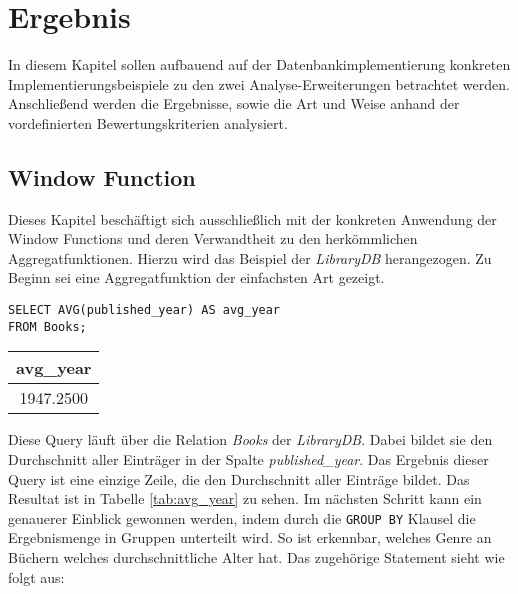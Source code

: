 \chapter{Ergebnis}
In diesem Kapitel sollen aufbauend auf der Datenbankimplementierung konkreten Implementierungsbeispiele
zu den zwei Analyse-Erweiterungen betrachtet werden. Anschließend werden die
Ergebnisse, sowie die Art und Weise anhand der vordefinierten Bewertungskriterien
analysiert.

\section{Window Function}
Dieses Kapitel beschäftigt sich ausschließlich mit der konkreten Anwendung der Window
Functions und deren Verwandtheit zu den herkömmlichen Aggregatfunktionen. Hierzu
wird das Beispiel der \textit{LibraryDB} herangezogen. Zu Beginn sei eine
Aggregatfunktion der einfachsten Art gezeigt.

\begin{minipage}{0.68\textwidth}
	 \begin{lstlisting}
SELECT AVG(published_year) AS avg_year
FROM Books;
	\end{lstlisting}
\end{minipage}
\hfill
\begin{minipage}{0.28\textwidth}
	\centering
	\begin{tabular}{|c|}
		\hline
		\textbf{avg\_year} \\
		\hline
		1947.2500          \\
		\hline
	\end{tabular}
	 \label{tab:avg_year}
\end{minipage}

Diese Query läuft über die Relation \textit{Books} der \textit{LibraryDB}. Dabei
bildet sie den Durchschnitt aller Einträger in der Spalte \textit{published\_year}.
Das Ergebnis dieser Query ist eine einzige Zeile, die den Durchschnitt aller Einträge
bildet. Das Resultat ist in Tabelle \ref{tab:avg_year} zu sehen. Im nächsten Schritt
kann ein genauerer Einblick gewonnen werden, indem durch die \texttt{GROUP BY} Klausel
die Ergebnismenge in Gruppen unterteilt wird. So ist erkennbar, welches Genre an
Büchern welches durchschnittliche Alter hat. Das zugehörige Statement sieht wie
folgt aus:

